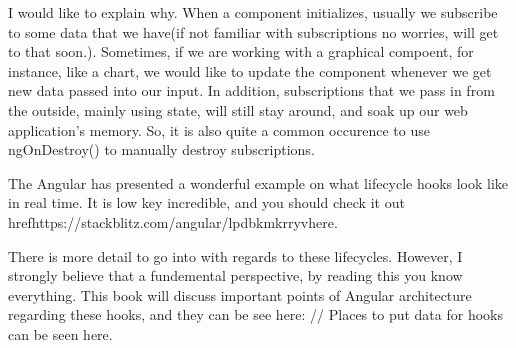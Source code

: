 I would like to explain why. When a component initializes, usually we subscribe
to some data that we have(if not familiar with subscriptions no worries, will
get to that soon.). Sometimes, if we are working with a graphical compoent, for
instance, like a chart, we would like to update the component whenever we get
new data passed into our input. In addition, subscriptions that we pass in from
the outside, mainly using state, will still stay around, and soak up our web
application's memory. So, it is also quite a common occurence to use ngOnDestroy()
to manually destroy subscriptions.

The Angular has presented a wonderful example on what lifecycle hooks look like
in real time. It is low key incredible, and you should check it out
href{https://stackblitz.com/angular/lpdbkmkrryv}{here}.

There is more detail to go into with regards to these lifecycles. However, I
strongly believe that a fundemental perspective, by reading this you know
everything. This book will discuss important points of Angular architecture
regarding these hooks, and they can be see here:
// Places to put data for hooks can be seen here.
